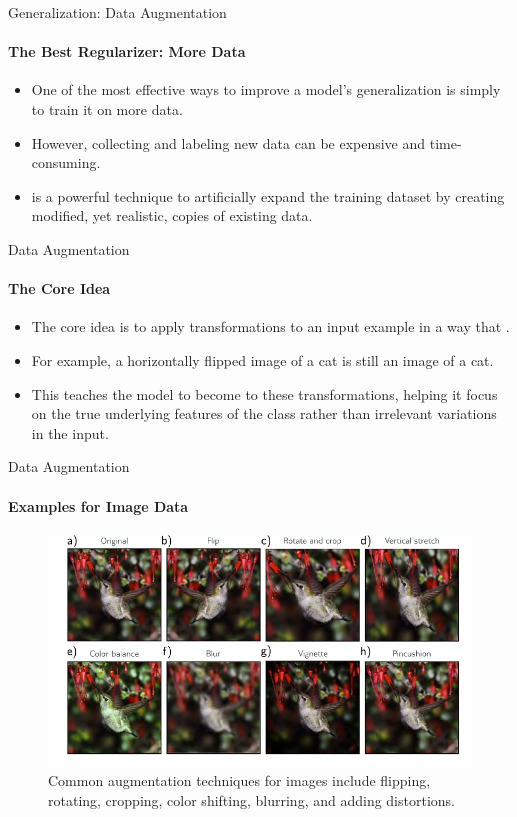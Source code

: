 \begin{frame}{Generalization: Data Augmentation}
    \framesubtitle{The Best Regularizer: More Data}
    \begin{itemize}
        \item One of the most effective ways to improve a model's generalization is simply to train it on more data.
        \item However, collecting and labeling new data can be expensive and time-consuming.
        \item {} is a powerful technique to artificially expand the training dataset by creating modified, yet realistic, copies of existing data.
    \end{itemize}
\end{frame}

\begin{frame}{Data Augmentation}
    \framesubtitle{The Core Idea}
    \begin{itemize}
        \item The core idea is to apply transformations to an input example in a way that .
        \item For example, a horizontally flipped image of a cat is still an image of a cat.
        \item This teaches the model to become  to these transformations, helping it focus on the true underlying features of the class rather than irrelevant variations in the input.
    \end{itemize}
\end{frame}

\begin{frame}{Data Augmentation}
    \framesubtitle{Examples for Image Data}
    \begin{figure}
        \centering
        \includegraphics[width=\linewidth]{images/data_augmentation_examples.png}
        \caption{Common augmentation techniques for images include flipping, rotating, cropping, color shifting, blurring, and adding distortions.}
    \end{figure}
\end{frame}

